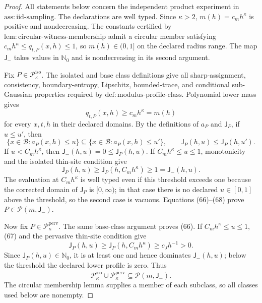 \documentclass{article}
\begin{document}
\begin{proof}
All statements below concern the independent product experiment in
\(\mathrm{ass:iid\text{-}sampling}\).  The declarations are well typed.
Since \(\kappa>2\), \(m(h)=c_mh^\kappa\) is positive and nondecreasing.
The constants certified by
\(\mathrm{lem:circular\text{-}witness\text{-}membership}\) admit a
circular member satisfying \(c_mh^\kappa\le q_{t,P}(x,h)\le1\), so
\(m(h)\in(0,1]\) on the declared radius range.  The map
\(\mathsf J_{-}\) takes values in \(\mathbb N_0\) and is nondecreasing
in its second argument.

Fix \(P\in\mathcal P_\kappa^{\mathrm{iso}}\).  The isolated and base
class definitions give all sharp-assignment, consistency,
boundary-entropy, Lipschitz, bounded-trace, and conditional sub-Gaussian
properties required by \(\mathrm{def:modulus\text{-}profile\text{-}class}\).
Polynomial lower mass gives
\[
 q_{t,P}(x,h)\ge c_mh^\kappa=m(h)
 \tag{66}
\]
for every \(x,t,h\) in their declared domains.  By the definitions of
\(a_P\) and \(\mathsf J_P\), if \(u\le u'\), then
\[
 \{x\in\mathcal B:a_P(x,h)\le u\}
 \subseteq\{x\in\mathcal B:a_P(x,h)\le u'\},
 \qquad \mathsf J_P(h,u)\le\mathsf J_P(h,u').
 \tag{67}
\]
If \(u<C_mh^\kappa\), then
\(\mathsf J_{-}(h,u)=0\le\mathsf J_P(h,u)\).  If
\(C_mh^\kappa\le u\le1\), monotonicity and the isolated thin-site
condition give
\[
 \mathsf J_P(h,u)\ge\mathsf J_P(h,C_mh^\kappa)
 \ge1=\mathsf J_{-}(h,u).
 \tag{68}
\]
The evaluation at \(C_mh^\kappa\) is well typed even if this threshold
exceeds one because the corrected domain of \(\mathsf J_P\) is
\([0,\infty)\); in that case there is no declared \(u\in[0,1]\) above
the threshold, so the second case is vacuous.  Equations (66)--(68) prove
\(P\in\mathcal P(m,\mathsf J_{-})\).

Now fix \(P\in\mathcal P_\kappa^{\mathrm{perv}}\).  The same base-class
argument proves (66).  If \(C_mh^\kappa\le u\le1\), (67) and the
pervasive thin-site condition give
\[
 \mathsf J_P(h,u)\ge\mathsf J_P(h,C_mh^\kappa)
 \ge c_Jh^{-1}>0.
\]
Since \(\mathsf J_P(h,u)\in\mathbb N_0\), it is at least one and hence
dominates \(\mathsf J_{-}(h,u)\); below the threshold the declared lower
profile is zero.  Thus
\[
 \mathcal P_\kappa^{\mathrm{iso}}\cup
 \mathcal P_\kappa^{\mathrm{perv}}
 \subseteq\mathcal P(m,\mathsf J_{-}).
 \tag{69}
\]
The circular membership lemma supplies a member of each subclass, so all
classes used below are nonempty.


\end{proof}
\end{document}
